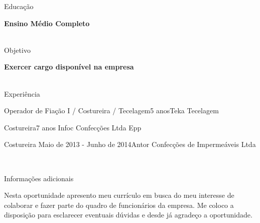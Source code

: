 \documentclass{resume} %
\begin{document}

\begin{rSection}{Educação}

{\bf Ensino Médio Completo} \hfill {\em } \\ 
 \\




\end{rSection}

\begin{rSection}{Objetivo}

{\bf Exercer cargo disponível na empresa} \hfill {\em } \\ 
 \\

\end{rSection}


\begin{rSection}{Experiência}

\begin{rSubsection}{Operador de Fiação I / Costureira / Tecelagem}{5 anos}{Teka Tecelagem}{}
\item 
\end{rSubsection}


\begin{rSubsection}{Costureira}{7 anos }{Infoc Confecções Ltda Epp}{}
\item 
\end{rSubsection}


\begin{rSubsection}{Costureira
}{Maio de 2013 - Junho de 2014}{Antor Confecções de Impermeáveis Ltda}{}
\item 
\end{rSubsection}

\
\end{rSection}


\begin{rSection}{Informações adicionais}
\item Nesta oportunidade apresento meu currículo em busca do meu interesse de colaborar e fazer parte do quadro de funcionários da empresa. Me coloco a disposição para esclarecer eventuais dúvidas e desde já agradeço a oportunidade.


\end{rSection}
\end{document}
